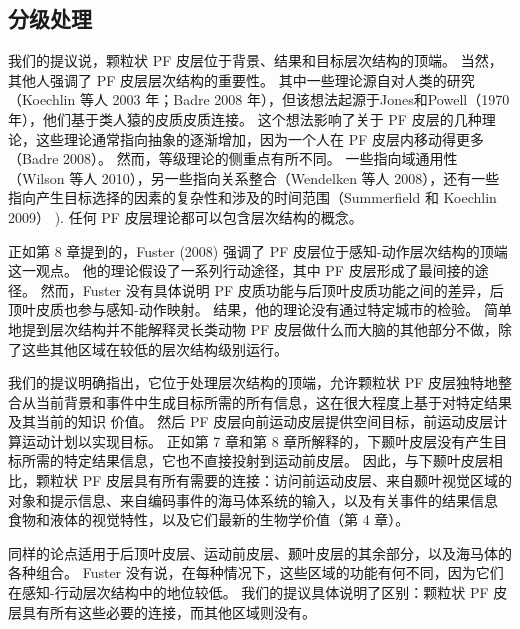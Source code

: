 \subsection{分级处理}
我们的提议说，颗粒状 PF 皮层位于背景、结果和目标层次结构的顶端。 当然，其他人强调了 PF 皮层层次结构的重要性。 其中一些理论源自对人类的研究（Koechlin 等人 2003 年；Badre 2008 年），但该想法起源于Jones和Powell（1970 年），他们基于类人猿的皮质皮质连接。 这个想法影响了关于 PF 皮层的几种理论，这些理论通常指向抽象的逐渐增加，因为一个人在 PF 皮层内移动得更多（Badre 2008）。 然而，等级理论的侧重点有所不同。 一些指向域通用性（Wilson 等人 2010），另一些指向关系整合（Wendelken 等人 2008），还有一些指向产生目标选择的因素的复杂性和涉及的时间范围（Summerfield 和 Koechlin 2009） ). 任何 PF 皮层理论都可以包含层次结构的概念。
\par 
正如第 8 章提到的，Fuster (2008) 强调了 PF 皮层位于感知-动作层次结构的顶端这一观点。 他的理论假设了一系列行动途径，其中 PF 皮层形成了最间接的途径。 然而，Fuster 没有具体说明 PF 皮质功能与后顶叶皮质功能之间的差异，后顶叶皮质也参与感知-动作映射。 结果，他的理论没有通过特定城市的检验。 简单地提到层次结构并不能解释灵长类动物 PF 皮层做什么而大脑的其他部分不做，除了这些其他区域在较低的层次结构级别运行。
\par 
我们的提议明确指出，它位于处理层次结构的顶端，允许颗粒状 PF 皮层独特地整合从当前背景和事件中生成目标所需的所有信息，这在很大程度上基于对特定结果及其当前的知识 价值。 然后 PF 皮层向前运动皮层提供空间目标，前运动皮层计算运动计划以实现目标。 正如第 7 章和第 8 章所解释的，下颞叶皮层没有产生目标所需的特定结果信息，它也不直接投射到运动前皮层。 因此，与下颞叶皮层相比，颗粒状 PF 皮层具有所有需要的连接：访问前运动皮层、来自颞叶视觉区域的对象和提示信息、来自编码事件的海马体系统的输入，以及有关事件的结果信息 食物和液体的视觉特性，以及它们最新的生物学价值（第 4 章）。
\par 
同样的论点适用于后顶叶皮层、运动前皮层、颞叶皮层的其余部分，以及海马体的各种组合。 Fuster 没有说，在每种情况下，这些区域的功能有何不同，因为它们在感知-行动层次结构中的地位较低。 我们的提议具体说明了区别：颗粒状 PF 皮层具有所有这些必要的连接，而其他区域则没有。
